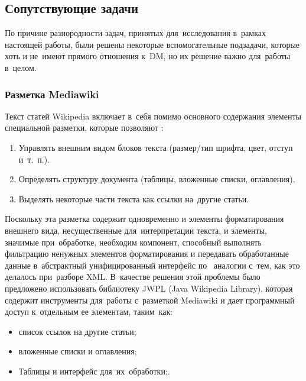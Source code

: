 \subsection{Сопутствующие задачи}

По причине разнородности задач, принятых для~исследования в~рамках настоящей работы,
были решены некоторые вспомогательные подзадачи, которые хоть и не~имеют прямого отношения к~DM, 
но их решение важно для~работы в~целом.

\subsubsection{Разметка Mediawiki}

Текст статей Wikipedia включает в~себя помимо основного содержания элементы специальной разметки, которые позволяют \cite{wikimarkup}:

\begin{enumerate}

\item{Управлять внешним видом блоков текста (размер/тип шрифта, цвет, отступ и~т.~п.).}
\item{Определять структуру документа (таблицы, вложенные списки, оглавления).}
\item{Выделять некоторые части текста как ссылки на~другие статьи.}

\end{enumerate}

Поскольку эта разметка содержит одновременно и элементы форматирования внешнего вида,
несущественные для~интерпретации текста, и элементы, значимые при~обработке,
необходим компонент, способный выполнять фильтрацию ненужных элементов форматирования
и передавать обработанные данные в~абстрактный унифицированный интерфейс 
по~ аналогии с~тем, как это делалось при~разборе XML.
В~качестве решения этой проблемы было предложено использовать библиотеку 
JWPL (Java Wikipedia Library)\cite{jwpl}, 
которая содержит инструменты для~работы с~разметкой Mediawiki\cite{wikimarkup} 
и дает программный доступ к~отдельным ее элементам, таким~как:

\begin{itemize}

\item {список ссылок на другие статьи;}
\item{вложенные списки и оглавления;}
\item{Таблицы и интерфейс для~их~обработки;.}

\end{itemize}

